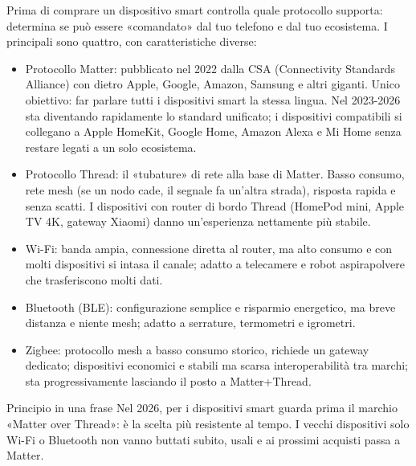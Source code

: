 


Prima di comprare un dispositivo smart controlla quale protocollo supporta: determina se può essere «comandato» dal tuo telefono e dal tuo ecosistema. I principali sono quattro, con caratteristiche diverse:

\begin{itemize}
  \item Protocollo Matter: pubblicato nel 2022 dalla CSA (Connectivity Standards Alliance) con dietro Apple, Google, Amazon, Samsung e altri giganti. Unico obiettivo: far parlare tutti i dispositivi smart la stessa lingua. Nel 2023-2026 sta diventando rapidamente lo standard unificato; i dispositivi compatibili si collegano a Apple HomeKit, Google Home, Amazon Alexa e Mi Home senza restare legati a un solo ecosistema.
  \item Protocollo Thread: il «tubature» di rete alla base di Matter. Basso consumo, rete mesh (se un nodo cade, il segnale fa un'altra strada), risposta rapida e senza scatti. I dispositivi con router di bordo Thread (HomePod mini, Apple TV 4K, gateway Xiaomi) danno un'esperienza nettamente più stabile.
  \item Wi-Fi: banda ampia, connessione diretta al router, ma alto consumo e con molti dispositivi si intasa il canale; adatto a telecamere e robot aspirapolvere che trasferiscono molti dati.
  \item Bluetooth (BLE): configurazione semplice e risparmio energetico, ma breve distanza e niente mesh; adatto a serrature, termometri e igrometri.
  \item Zigbee: protocollo mesh a basso consumo storico, richiede un gateway dedicato; dispositivi economici e stabili ma scarsa interoperabilità tra marchi; sta progressivamente lasciando il posto a Matter+Thread.
\end{itemize}

\begin{tcbinfo}{Principio in una frase}
Nel 2026, per i dispositivi smart guarda prima il marchio «Matter over Thread»: è la scelta più resistente al tempo. I vecchi dispositivi solo Wi-Fi o Bluetooth non vanno buttati subito, usali e ai prossimi acquisti passa a Matter.

\end{tcbinfo}

